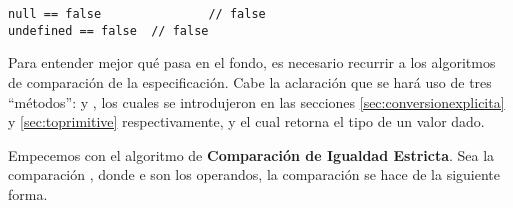 \begin{lstlisting}[title={Comparando \code{null} y \code{undefined} con \code{false}}]
null == false				// false
undefined == false	// false
\end{lstlisting}

Para entender mejor qué pasa en el fondo, es necesario recurrir a los algoritmos de comparación de la especificación. Cabe la aclaración que se hará uso de tres "`métodos"':  y , los cuales se introdujeron en las secciones \ref{sec:conversionexplicita} y \ref{sec:toprimitive} respectivamente, y  el cual retorna el tipo de un valor dado. 

Empecemos con el algoritmo de \textbf{Comparación de Igualdad Estricta}. Sea la comparación , donde  e  son los operandos, la comparación se hace de la siguiente forma.

